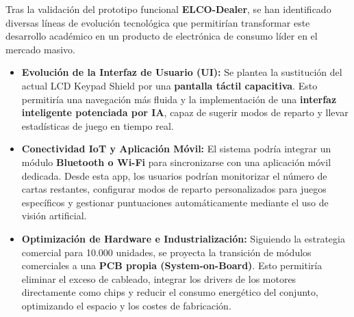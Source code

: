 Tras la validación del prototipo funcional \textbf{ELCO-Dealer}, se han identificado diversas líneas de evolución tecnológica que permitirían transformar este desarrollo académico en un producto de electrónica de consumo líder en el mercado masivo.

\begin{itemize}
    \item \textbf{Evolución de la Interfaz de Usuario (UI):} Se plantea la sustitución del actual LCD Keypad Shield por una \textbf{pantalla táctil capacitiva}. Esto permitiría una navegación más fluida y la implementación de una \textbf{interfaz inteligente potenciada por IA}, capaz de sugerir modos de reparto y llevar estadísticas de juego en tiempo real.

    
    \item \textbf{Conectividad IoT y Aplicación Móvil:} El sistema podría integrar un módulo \textbf{Bluetooth o Wi-Fi} para sincronizarse con una aplicación móvil dedicada. Desde esta app, los usuarios podrían monitorizar el número de cartas restantes, configurar modos de reparto personalizados para juegos específicos y gestionar puntuaciones automáticamente mediante el uso de visión artificial.
    
    \item \textbf{Optimización de Hardware e Industrialización:} Siguiendo la estrategia comercial para 10.000 unidades, se proyecta la transición de módulos comerciales a una \textbf{PCB propia (System-on-Board)}. Esto permitiría eliminar el exceso de cableado, integrar los drivers de los motores directamente como chips y reducir el consumo energético del conjunto, optimizando el espacio y los costes de fabricación.
\end{itemize}